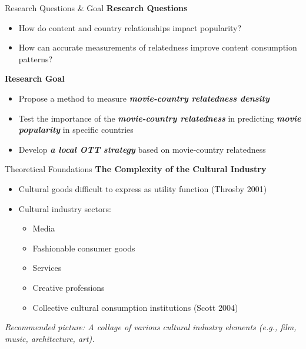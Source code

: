 \documentclass[
  ignorenonframetext,
]{beamer}
\begin{document}
\begin{frame}{Research Questions \& Goal}
\protect\hypertarget{research-questions-goal}{}
\textbf{Research Questions}

\begin{itemize}
\item
  How do content and country relationships impact popularity?
\item
  How can accurate measurements of relatedness improve content
  consumption patterns?
\end{itemize}

\textbf{Research Goal}

\begin{itemize}
\item
  Propose a method to measure \textbf{\emph{movie-country relatedness
  density}}
\item
  Test the importance of the \textbf{\emph{movie-country relatedness}}
  in predicting \textbf{\emph{movie popularity}} in specific countries
\item
  Develop \textbf{\emph{a local OTT strategy}} based on movie-country
  relatedness
\end{itemize}
\end{frame}

\begin{frame}{Theoretical Foundations}
\protect\hypertarget{theoretical-foundations}{}
\textbf{The Complexity of the Cultural Industry}

\begin{itemize}
\item
  Cultural goods difficult to express as utility function (Throsby 2001)
\item
  Cultural industry sectors:

  \begin{itemize}
  \item
    Media
  \item
    Fashionable consumer goods
  \item
    Services
  \item
    Creative professions
  \item
    Collective cultural consumption institutions (Scott 2004)
  \end{itemize}
\end{itemize}

\emph{Recommended picture: A collage of various cultural industry
elements (e.g., film, music, architecture, art).}
\end{frame}
\end{document}
